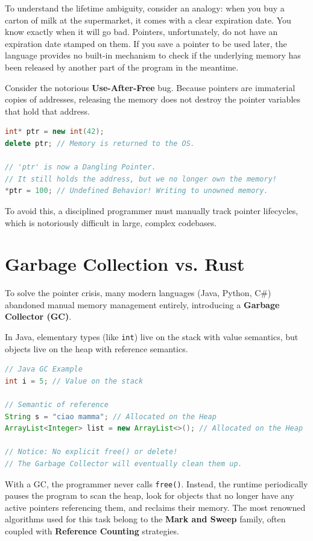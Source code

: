 To understand the lifetime ambiguity, consider an analogy: when you buy a carton of milk at the supermarket, it comes with a clear expiration date. You know exactly when it will go bad. Pointers, unfortunately, do not have an expiration date stamped on them. If you save a pointer to be used later, the language provides no built-in mechanism to check if the underlying memory has been released by another part of the program in the meantime. 

Consider the notorious \textbf{Use-After-Free} bug. Because pointers are immaterial copies of addresses, releasing the memory does not destroy the pointer variables that hold that address.

\begin{lstlisting}[language=C++]
int* ptr = new int(42);
delete ptr; // Memory is returned to the OS.

// 'ptr' is now a Dangling Pointer. 
// It still holds the address, but we no longer own the memory!
*ptr = 100; // Undefined Behavior! Writing to unowned memory.
\end{lstlisting}

To avoid this, a disciplined programmer must manually track pointer lifecycles, which is notoriously difficult in large, complex codebases.

\section{Garbage Collection vs. Rust}

To solve the pointer crisis, many modern languages (Java, Python, C\#) abandoned manual memory management entirely, introducing a \textbf{Garbage Collector (GC)}.

In Java, elementary types (like \texttt{int}) live on the stack with value semantics, but objects live on the heap with reference semantics.

\begin{lstlisting}[language=Java]
// Java GC Example
int i = 5; // Value on the stack

// Semantic of reference
String s = "ciao mamma"; // Allocated on the Heap
ArrayList<Integer> list = new ArrayList<>(); // Allocated on the Heap

// Notice: No explicit free() or delete! 
// The Garbage Collector will eventually clean them up.
\end{lstlisting}

With a GC, the programmer never calls \texttt{free()}. Instead, the runtime periodically pauses the program to scan the heap, look for objects that no longer have any active pointers referencing them, and reclaims their memory. The most renowned algorithms used for this task belong to the \textbf{Mark and Sweep} family, often coupled with \textbf{Reference Counting} strategies. 

